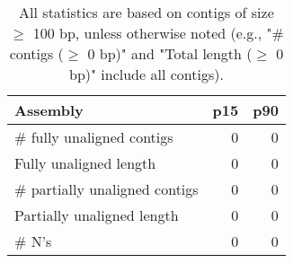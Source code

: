 \documentclass[12pt,a4paper]{article}
\begin{document}
\begin{table}[ht]
\begin{center}
\caption{All statistics are based on contigs of size $\geq$ 100 bp, unless otherwise noted (e.g., "\# contigs ($\geq$ 0 bp)" and "Total length ($\geq$ 0 bp)" include all contigs).}
\begin{tabular}{|l*{2}{|r}|}
\hline
Assembly & p15 & p90 \\ \hline
\# fully unaligned contigs & 0 & 0 \\ \hline
Fully unaligned length & 0 & 0 \\ \hline
\# partially unaligned contigs & 0 & 0 \\ \hline
Partially unaligned length & 0 & 0 \\ \hline
\# N's & 0 & 0 \\ \hline
\end{tabular}
\end{center}
\end{table}
\end{document}
